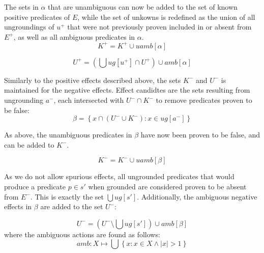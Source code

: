 \documentclass[../Master.tex]{subfiles}
\begin{document}
The sets in $\alpha$ that are unambiguous can now be added to the
set of known positive predicates of $E$, while the set of unkowns
is redefined as the union of all ungroundings of $u^{+}$ that were
not previously proven included in or absent from $E^{+}$, as well
as all ambiguous predicates in $\alpha$.
\[
K^{+}=K^{+}\cup uamb\left[\alpha\right]
\]


\[
U^{+}=\left(\bigcup ug\left[u^{+}\right]\cap U^{+}\right)\cup amb\left[\alpha\right]
\]


Similarly to the positive effects described above, the sets $K^{-}$
and $U^{-}$ is maintained for the negative effects. Effect candidtes
are the sets resulting from ungrounding $a^{-}$, each intersected
with $U^{-}\cap K^{-}$ to remove predicates proven to be false:
\[
\beta=\left\{ x\cap\left(U^{-}\cup K^{-}\right):x\in ug\left[a^{-}\right]\right\}
\]


As above, the unambiguous predicates in $\beta$ have now been proven
to be false, and can be added to $K^{-}$.

\[
K^{-}=K^{-}\cup uamb\left[\beta\right]
\]


As we do not allow spurious effects, all ungrounded predicates that
would produce a predicate $p\in s'$ when grounded are considered
proven to be absent from $E^{-}$. This is exactly the set $\bigcup ug\left[s'\right]$.
Additionally, the ambiguous negative effects in $\beta$ are added
to the set $U^{-}$:

\[
U^{-}=\left(U^{-}\setminus\bigcup ug\left[s'\right]\right)\cup amb\left[\beta\right]
\]
where the ambiguous actions are found as follows:
\[
amb:X\mapsto\bigcup\left\{ x:x\in X\land|x|>1\right\}
\]
\end{document}
